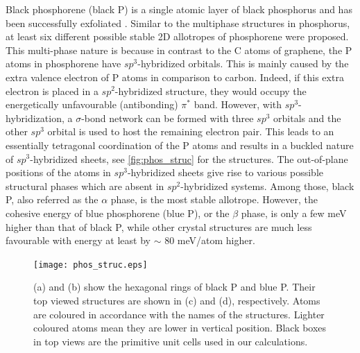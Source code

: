 Black phosphorene (black P) is a single atomic layer of black phosphorus and has been successfully exfoliated \cite{Han2014,Li2014}. Similar to the multiphase structures in phosphorus, at least six different possible stable 2D allotropes of phosphorene were proposed\cite{Zhu2014,Guan2014a,Wu2015}. This multi-phase nature is because in contrast to the C atoms of graphene, the P atoms in phosphorene have $sp^3$-hybridized orbitals. This is mainly caused by the extra valence electron of P atoms in comparison to carbon. Indeed, if this extra electron is placed in a $sp^2$-hybridized structure, they would occupy the energetically unfavourable (antibonding) $\pi^*$ band. However, with $sp^3$-hybridization, a $\sigma$-bond network can be formed with three $sp^3$ orbitals and the other $sp^3$ orbital is used to host the remaining electron pair. This leads to an essentially tetragonal coordination of the P atoms and results in a buckled nature of $sp^3$-hybridized sheets, see \autoref{fig:phos_struc} for the structures. The out-of-plane positions of the atoms in $sp^3$-hybridized sheets give rise to various possible structural phases which are absent in $sp^2$-hybridized systems. Among those, black P, also referred as the $\alpha$ phase, is the most stable allotrope. However, the cohesive energy of blue phosphorene (blue P), or the $\beta$ phase, is only a few meV higher than that of black P, while other crystal structures are much less favourable with energy at least by $\sim$ 80 meV/atom higher.  

\begin{figure}[htbp] 
\centering
\texttt{[image: phos\_struc.eps]}%
\caption[Black and blue phosphorene structures]{(a) and (b) show the hexagonal rings of black P and blue P. Their top viewed structures are shown in (c) and (d), respectively. Atoms are coloured in accordance with the names of the structures. Lighter coloured atoms mean they are lower in vertical position. Black boxes in top views are the primitive unit cells used in our calculations. }
\label{fig:phos_struc}
\end{figure}

